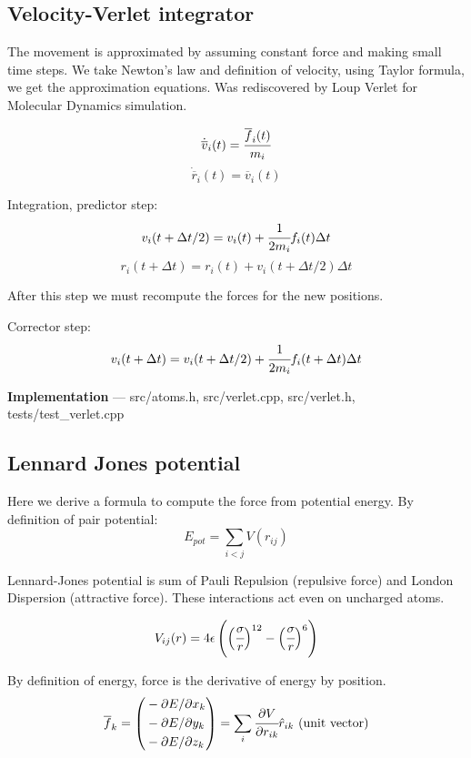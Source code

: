 \documentclass[12pt,a4paper]{article}
\newcommand{\mat}[1]{\overline{#1}}
\begin{document}
\newpage
\subsection*{Velocity-Verlet integrator}

The movement is approximated by assuming constant force and making small time steps. We take Newton's law and definition of velocity, using Taylor formula, we get the approximation equations. Was rediscovered by Loup Verlet \cite{verlet} for Molecular Dynamics simulation.

\[ \dot{\mat{v}}_i(t) = \cfrac{\mat{f}_i(t)}{m_i} \]
\[ \dot{\mat{r}}_i(t) = \mat{v}_i(t) \]

Integration, predictor step:
\[
v_i(t + \Delta t/2) = v_i(t) + \cfrac{1}{2m_i} f_i(t) \Delta t
\]
\[ r_i(t+\Delta t) = r_i(t) + v_i(t+ \Delta t/2) \Delta t \]

After this step we must recompute the forces for the new positions.

Corrector step:
\[ v_i(t+\Delta t) = v_i(t+\Delta t/2) + \cfrac{1}{2m_i}f_i(t+\Delta t) \Delta t \]

{\bf Implementation} --- src/atoms.h, src/verlet.cpp, src/verlet.h, tests/test\_verlet.cpp

\subsection*{Lennard Jones potential}

Here we derive a formula to compute the force from potential energy. By definition of pair potential:
\[
E_{pot} = \sum_{i<j} V(r_{ij})
\]

Lennard-Jones potential \cite{lennard-jones} is sum of Pauli Repulsion (repulsive force) and London Dispersion (attractive force). These interactions act even on uncharged atoms.

\[
V_{ij}(r) = 4\epsilon \left( \Bigl(\cfrac{\sigma}{r}\Bigr)^{12} - \Bigl(\cfrac{\sigma}{r}\Bigr)^{6} \right)
\]

By definition of energy, force is the derivative of energy by position.
\[
\mat{f}_k = \left( \begin{aligned}
	& - \partial E / \partial x_k \\
	& - \partial E / \partial y_k \\
	& - \partial E / \partial z_k \\
\end{aligned} \right) = \sum_i \cfrac{\partial V}{\partial r_{ik}} {\hat r_{ik}} \text{\ (unit vector)}
\]
\end{document}
